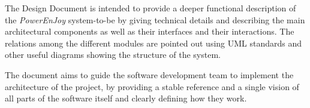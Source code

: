 The Design Document is intended to provide a deeper functional description of the \emph{PowerEnJoy} system-to-be by giving technical details and describing the main architectural components as well as their interfaces and their interactions. The relations among the different modules are pointed out using UML standards and other useful diagrams showing the structure of the system.

The document aims to guide the software development team to implement the architecture of the project, by providing a stable reference and a single vision of all parts of the software itself and clearly defining how they work.